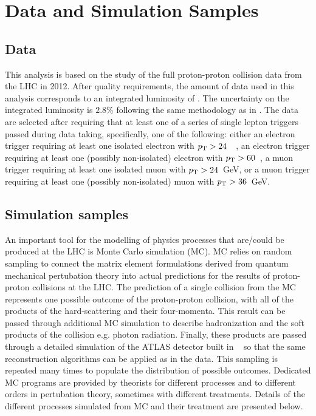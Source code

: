 \section{Data and Simulation Samples}
\subsection{Data}
\label{sec:subsection_data}



This analysis is based on the study of the full proton-proton collision
data from the LHC in 2012. After quality requirements, the amount 
of data used in this analysis corresponds to 
an integrated luminosity of \lumi.
The uncertainty on the integrated luminosity is $2.8\%$ 
following the same methodology as in \cite{Aad:2013ucp}.
The data are selected after requiring that at least one
of a series of single lepton triggers passed during data taking, 
specifically, one of the following:
either an electron trigger 
requiring at least one isolated
electron with $p_{\mathrm{T}}>24$~\GeV~, an electron trigger requiring
at least one (possibly non-isolated) electron 
with $p_{\mathrm{T}}>60$~\GeV, a muon 
trigger requiring at least one isolated muon with $p_{\mathrm{T}}>24$~GeV,
or a muon trigger requiring at least one 
(possibly non-isolated) muon with $p_{\mathrm{T}}>36$~GeV.


\subsection{Simulation samples}

An important tool for the modelling of physics processes
that are/could be produced at the LHC is Monte Carlo simulation (MC).
MC relies on random sampling to connect the matrix element formulations
derived from quantum mechanical pertubation theory into 
actual predictions for the results of proton-proton collisions
at the LHC.
The prediction of a single collision from the MC represents
one possible outcome of the proton-proton collision, with all of the 
products of the hard-scattering and their four-momenta.
This result can be passed through additional MC simulation to describe
hadronization and the soft products of the collision e.g. photon radiation.
Finally, these products are passed through a detailed 
simulation of the ATLAS detector built in \geant~\cite{Agostinelli:2002hh}
so that the same reconstruction algorithms
can be applied as in the data.
This sampling is repeated many times to populate the 
distribution of possible
outcomes. Dedicated MC programs are provided by theorists for 
different processes and to different orders in pertubation theory,
sometimes with different treatments.
Details of the different processes simulated from MC and their
treatment are presented below.




